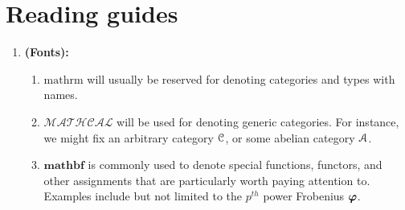 \chapter{Reading guides}
    \begin{enumerate}
        \item \textbf{(Fonts):}
            \begin{enumerate}
                \item $\mathrm{mathrm}$ will usually be reserved for denoting categories and types with names. 
                \item $\mathcal{MATHCAL}$ will be used for denoting generic categories. For instance, we might fix an arbitrary category $\mathcal{C}$, or some abelian category $\mathcal{A}$. 
                \item $\mathbf{mathbf}$ is commonly used to denote special functions, functors, and other assignments that are particularly worth paying attention to. Examples include but not limited to the $p^{th}$ power Frobenius $\bm{\varphi}$.
                

\end{enumerate}
\end{enumerate}
